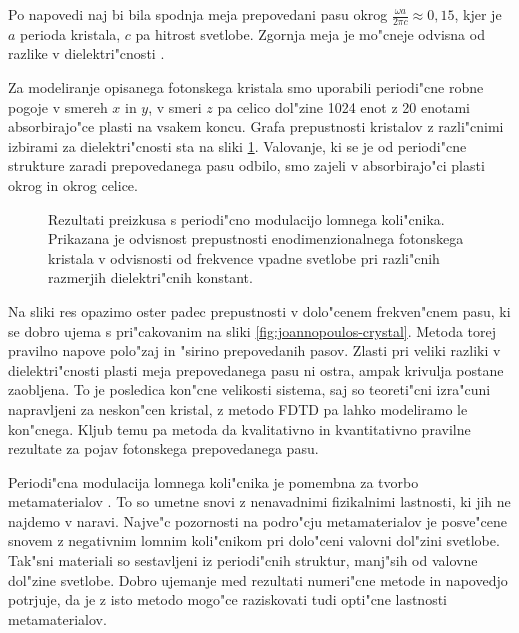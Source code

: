 \documentclass[12pt,twoside,openright,final]{report}
\begin{document}
Po napovedi naj bi bila spodnja meja prepovedani pasu okrog $\frac{\omega a}{2\pi c} \approx 0,\!15$, kjer je $a$ perioda kristala, $c$ pa hitrost svetlobe. 
Zgornja meja je mo"cneje odvisna od razlike v dielektri"cnosti \cite{joannopoulos}. 

Za modeliranje opisanega fotonskega kristala smo uporabili periodi"cne robne pogoje v smereh $x$ in $y$, v smeri $z$ pa celico dol"zine 1024 enot z 20 enotami absorbirajo"ce plasti na vsakem koncu. 
Grafa prepustnosti kristalov z razli"cnimi izbirami za dielektri"cnosti sta na sliki \ref{fig:test-periodic}. 
Valovanje, ki se je od periodi"cne strukture zaradi prepovedanega pasu odbilo, smo zajeli v absorbirajo"ci plasti okrog in okrog celice. 

\begin{figure}[!htbp]
 
 \caption{Rezultati preizkusa s periodi"cno modulacijo lomnega koli"cnika. Prikazana je odvisnost prepustnosti enodimenzionalnega fotonskega kristala v odvisnosti od frekvence vpadne svetlobe pri razli"cnih razmerjih dielektri"cnih konstant. }
 \label{fig:test-periodic}
\end{figure}

Na sliki res opazimo oster padec prepustnosti v dolo"cenem frekven"cnem pasu, ki se dobro ujema s pri"cakovanim na sliki \ref{fig:joannopoulos-crystal}. 
Metoda torej pravilno napove polo"zaj in "sirino prepovedanih pasov. 
Zlasti pri veliki razliki v dielektri"cnosti plasti meja prepovedanega pasu ni ostra, ampak krivulja postane zaobljena. 
To je posledica kon"cne velikosti sistema, saj so teoreti"cni izra"cuni napravljeni za neskon"cen kristal, z metodo \acs{FDTD} pa lahko modeliramo le kon"cnega. 
Kljub temu pa metoda da kvalitativno in kvantitativno pravilne rezultate za pojav fotonskega prepovedanega pasu. 

Periodi"cna modulacija lomnega koli"cnika je pomembna za tvorbo metamaterialov \cite{metamaterials}. 
To so umetne snovi z nenavadnimi fizikalnimi lastnosti, ki jih ne najdemo v naravi. 
Najve"c pozornosti na podro"cju metamaterialov je posve"cene snovem z negativnim lomnim koli"cnikom pri dolo"ceni valovni dol"zini svetlobe. 
Tak"sni materiali so sestavljeni iz periodi"cnih struktur, manj"sih od valovne dol"zine svetlobe. 
Dobro ujemanje med rezultati numeri"cne metode in napovedjo potrjuje, da je z isto metodo mogo"ce raziskovati tudi opti"cne lastnosti metamaterialov. 
\end{document}

